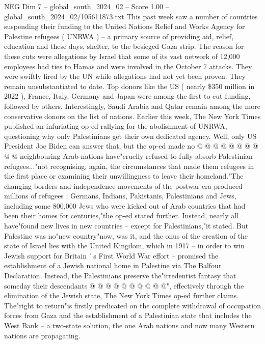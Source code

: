 \begin{textsample}{NEG Dim 7 – global\_south\_2024\_02 – Score 1.00 – global\_south\_2024\_02/105611873.txt}  \label{ex:f7_neg_257}
This past week saw a number of countries suspending their funding to the United Nations Relief and Works Agency for Palestine refugees ( UNRWA ) -- a primary source of providing aid, relief, education and these days, shelter, to the besieged Gaza strip.
The reason for these cuts were allegations by Israel that some of its vast network of 12,000 employees had ties to Hamas and were involved in the October 7 attacks.
They were swiftly fired by the UN while allegations had not yet been proven.
They remain unsubstantiated to date.
Top donors like the US ( nearly \$350 million in 2022 ), France, Italy, Germany and Japan were among the first to cut funding, followed by others.
Interestingly, Saudi Arabia and Qatar remain among the more conservative donors on the list of nations.
Earlier this week, The New York Times published an infuriating op-ed rallying for the abolishment of UNRWA, questioning why only Palestinians get their own dedicated agency.
Well, only US President Joe Biden can answer that, but the op-ed made no @ @ @ @ @ @ @ @ @ @ neighbouring Arab nations have"cruelly refused to fully absorb Palestinian refugees..."not recognising, again, the circumstances that made them refugees in the first place or examining their unwillingness to leave their homeland."The changing borders and independence movements of the postwar era produced millions of refugees : Germans, Indians, Pakistanis, Palestinians and Jews, including some 800,000 Jews who were kicked out of Arab countries that had been their homes for centuries,"the op-ed stated further.
Instead, nearly all have"found new lives in new countries -- except for Palestinians,"it stated.
But Palestine was no"new country"now, was it, and the onus of the creation of the state of Israel lies with the United Kingdom, which in 1917 -- in order to win Jewish support for Britain ' s First World War effort -- promised the establishment of a Jewish national home in Palestine via The Balfour Declaration.
Instead, the Palestinians preserve the"irredentist fantasy that someday their descendants @ @ @ @ @ @ @ @ @ @", effectively through the elimination of the Jewish state, The New York Times op-ed further claims.
The"right to return"is firstly predicated on the complete withdrawal of occupation forces from Gaza and the establishment of a Palestinian state that includes the West Bank -- a two-state solution, the one Arab nations and now many Western nations are propagating.

\end{textsample}
